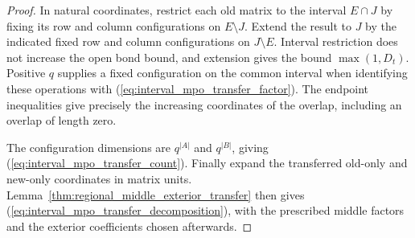 \begin{proof}\leanok
    In natural coordinates, restrict each old matrix to the interval
    $E\cap J$ by fixing its row and column configurations on $E\setminus J$.
    Extend the result to $J$ by the indicated fixed row and column
    configurations on $J\setminus E$. Interval restriction does not
    increase the open bond bound, and extension gives the bound
    $\max(1,D_t)$. Positive $q$ supplies a fixed configuration on the
    common interval when identifying these operations with
    (\ref{eq:interval_mpo_transfer_factor}). The endpoint inequalities
    give precisely the increasing coordinates of the overlap, including
    an overlap of length zero.

    The configuration dimensions are $q^{|A|}$ and $q^{|B|}$, giving
    (\ref{eq:interval_mpo_transfer_count}). Finally expand the transferred
    old-only and new-only coordinates in matrix units. Lemma~\ref{thm:regional_middle_exterior_transfer} then gives
    (\ref{eq:interval_mpo_transfer_decomposition}), with the prescribed
    middle factors and the exterior coefficients chosen afterwards.
\end{proof}


